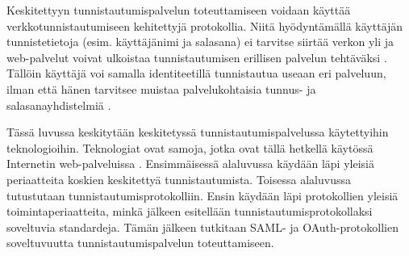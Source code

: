Keskitettyyn tunnistautumispalvelun toteuttamiseen voidaan käyttää verkkotunnistautumiseen kehitettyjä protokollia. Niitä hyödyntämällä käyttäjän tunnistetietoja (esim. käyttäjänimi ja salasana) ei tarvitse siirtää verkon yli ja web-palvelut voivat ulkoistaa tunnistautumisen erillisen palvelun tehtäväksi \cite{nisti}. Tällöin käyttäjä voi samalla identiteetillä tunnistautua useaan eri palveluun, ilman että hänen tarvitsee muistaa palvelukohtaisia tunnus- ja salasanayhdistelmiä \cite{open_identity}.

Tässä luvussa keskitytään keskitetyssä tunnistautumispalvelussa käytettyihin teknologioihin. Teknologiat ovat samoja, jotka ovat tällä hetkellä käytössä Internetin web-palveluissa \cite{facebook}. Ensimmäisessä alaluvussa käydään läpi yleisiä periaatteita koskien keskitettyä tunnistautumista. Toisessa alaluvussa tutustutaan tunnistautumisprotokolliin. Ensin käydään läpi protokollien yleisiä toimintaperiaatteita, minkä jälkeen esitellään tunnistautumisprotokollaksi soveltuvia standardeja. Tämän jälkeen tutkitaan SAML- ja OAuth-protokollien soveltuvuutta tunnistautumispalvelun toteuttamiseen.